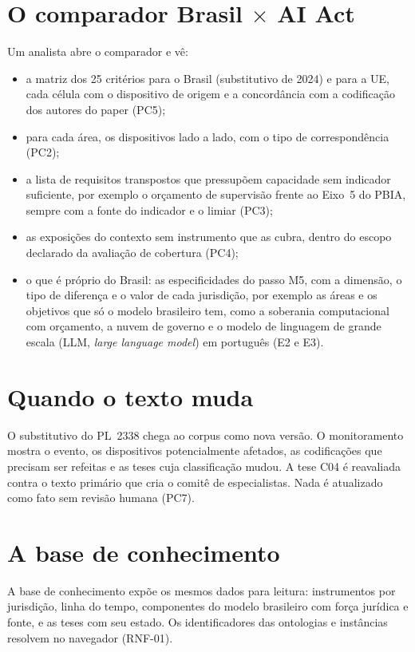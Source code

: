 \documentclass[12pt,a4paper,oneside,english,brazil]{abntex2}
\newcommand{\rf}[1]{{\footnotesize(#1)}}
\begin{document}
\section{\texorpdfstring{O comparador Brasil $\times$ AI Act}{O comparador Brasil × AI Act}}
Um analista abre o comparador e vê:
\begin{itemize}[leftmargin=*]
  \item a matriz dos 25 critérios para o Brasil (substitutivo de 2024) e para a UE, cada célula com o dispositivo de origem e a concordância com a codificação dos autores do paper \rf{PC5};
  \item para cada área, os dispositivos lado a lado, com o tipo de correspondência \rf{PC2};
  \item a lista de requisitos transpostos que pressupõem capacidade sem indicador suficiente, por exemplo o orçamento de supervisão frente ao Eixo~5 do PBIA, sempre com a fonte do indicador e o limiar \rf{PC3};
  \item as exposições do contexto sem instrumento que as cubra, dentro do escopo declarado da avaliação de cobertura \rf{PC4};
  \item o que é próprio do Brasil: as especificidades do passo M5, com a dimensão, o tipo de diferença e o valor de cada jurisdição, por exemplo as áreas e os objetivos que só o modelo brasileiro tem, como a soberania computacional com orçamento, a nuvem de governo e o modelo de linguagem de grande escala (LLM, \emph{large language model}) em português (E2 e E3).
\end{itemize}

\section{Quando o texto muda}
O substitutivo do PL~2338 chega ao corpus como nova versão. O monitoramento mostra o evento, os dispositivos potencialmente afetados, as codificações que precisam ser refeitas e as teses cuja classificação mudou. A tese C04 é reavaliada contra o texto primário que cria o comitê de especialistas. Nada é atualizado como fato sem revisão humana \rf{PC7}.

\section{A base de conhecimento}
A base de conhecimento expõe os mesmos dados para leitura: instrumentos por jurisdição, linha do tempo, componentes do modelo brasileiro com força jurídica e fonte, e as teses com seu estado. Os identificadores das ontologias e instâncias resolvem no navegador \rf{RNF-01}.
\end{document}
